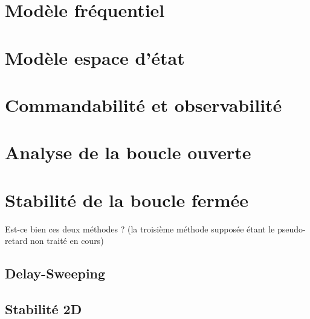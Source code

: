 	\section{Modèle fréquentiel}
	\section{Modèle espace d'état}
	\section{Commandabilité et observabilité}
	\section{Analyse de la boucle ouverte}
	\section{Stabilité de la boucle fermée}
	Est-ce bien ces deux méthodes ? (la troisième méthode supposée étant le pseudo-retard non traité en cours)
		\subsection{Delay-Sweeping}
		\subsection{Stabilité 2D}


